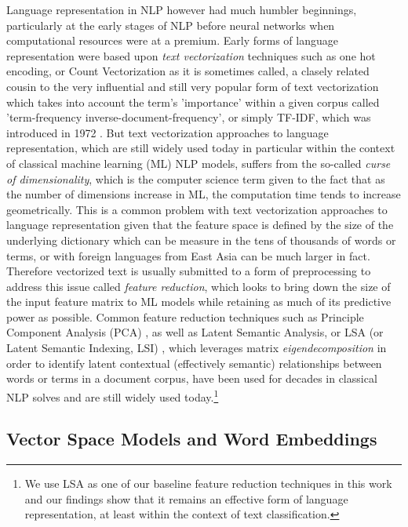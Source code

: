 \documentclass[final]{clv2025}
\begin{document}
Language representation in NLP however had much humbler beginnings, particularly at the early stages of NLP before neural networks when computational resources were at a premium. Early forms of language representation were based upon \textit{text vectorization} techniques such as one hot encoding, or Count Vectorization as it is sometimes called, a clasely related cousin to the very influential and still very popular form of text vectorization which takes into account the term's 'importance' within a given corpus called 'term-frequency inverse-document-frequency', or simply TF-IDF, which was introduced in 1972 \cite{sparckjones1972statistical}. But text vectorization approaches to language representation, which are still widely used today in particular within the context of classical machine learning (ML) NLP models, suffers from the so-called \textit{curse of dimensionality}, which is the computer science term given to the fact that as the number of dimensions increase in ML, the computation time tends to increase geometrically. This is a common problem with text vectorization approaches to language representation given that the feature space is defined by the size of the underlying dictionary which can be measure in the tens of thousands of words or terms, or with foreign languages from East Asia can be much larger in fact. Therefore vectorized text is usually submitted to a form of preprocessing to address this issue called \textit{feature reduction}, which looks to bring down the size of the input feature matrix to ML models while retaining as much of its predictive power as possible. Common feature reduction techniques such as Principle Component Analysis (PCA) \cite{pearson01111901} \cite{hotelling1933AnalysisOA}, as well as Latent Semantic Analysis, or LSA (or Latent Semantic Indexing, LSI) \cite{deerwester}, which leverages matrix \textit{eigendecomposition} in order to identify latent contextual (effectively semantic) relationships between words or terms in a document corpus, have been used for decades in classical NLP solves and are still widely used today.\footnote{We use LSA as one of our baseline feature reduction techniques in this work and our findings show that it remains an effective form of language representation, at least within the context of text classification.}


\subsection{Vector Space Models and Word Embeddings}
\end{document}
